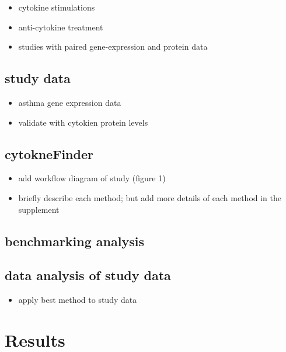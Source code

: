 \documentclass[runningheads]{llncs}
\providecommand{\tightlist}{%
  \setlength{\itemsep}{0pt}\setlength{\parskip}{0pt}}
\begin{document}
\begin{itemize}
\tightlist
\item
  cytokine stimulations
\item
  anti-cytokine treatment
\item
  studies with paired gene-expression and protein data
\end{itemize}

\hypertarget{study-data}{%
\subsection{study data}\label{study-data}}

\begin{itemize}
\tightlist
\item
  asthma gene expression data
\item
  validate with cytokien protein levels
\end{itemize}

\hypertarget{cytoknefinder}{%
\subsection{cytokneFinder}\label{cytoknefinder}}

\begin{itemize}
\tightlist
\item
  add workflow diagram of study (figure 1)
\item
  briefly describe each method; but add more details of each method in
  the supplement
\end{itemize}

\hypertarget{benchmarking-analysis}{%
\subsection{benchmarking analysis}\label{benchmarking-analysis}}

\hypertarget{data-analysis-of-study-data}{%
\subsection{data analysis of study
data}\label{data-analysis-of-study-data}}

\begin{itemize}
\tightlist
\item
  apply best method to study data
\end{itemize}

\hypertarget{results}{%
\section{Results}\label{results}}
\end{document}
